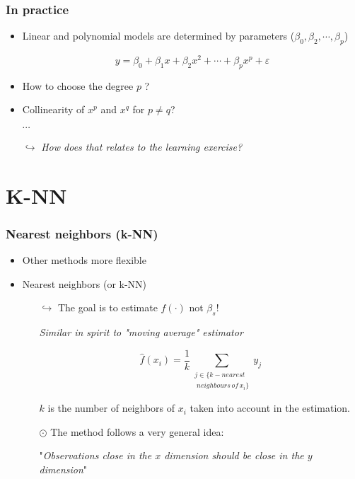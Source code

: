 \documentclass[xcolor=x11names,compress, aspectratio=169]{beamer}
\renewcommand{\(}{\begin{columns}}
\renewcommand{\)}{\end{columns}}
\newcommand{\<}[1]{\begin{column}{#1}}
\renewcommand{\>}{\end{column}}
\begin{document}
\begin{frame} %
\frametitle{In practice}

\begin{itemize}[<+->]
 \item Linear and polynomial models are determined by parameters ($\beta_0, \beta_2, \cdots, \beta_p$)
 \item[]  $$y = \beta_0 + \beta_1 x +  \beta_2 x^2 + \cdots + \beta_p x^p + \varepsilon$$
 \item How to choose the degree $p$ ?
 \item Collinearity of $x^p$ and $x^q$ for $ p \neq q$?
 \item[] $\cdots$
 \item[$\hookrightarrow$]  \textit{How does that relates to the learning exercise?}
 \end{itemize}
\end{frame}

\section{K-NN}

\begin{frame} %
\frametitle{ Nearest neighbors (k-NN)}

\begin{itemize}[<+->]
     \item Other methods more flexible
       \item Nearest neighbors  (or k-NN)
     \begin{itemize}[<+->]
        \item[$\hookrightarrow$] The goal is to estimate $f(\cdot)$ not $\beta_s$!
         \item[] \textit{Similar in spirit to "moving average" estimator}
         \item[] $$ \widehat{f} (x_i) = \frac{1}{k} \sum_{\substack{j \in \{ k-nearest \\ \; neighbours \, of \, x_i \} }}  y_j$$
         \item[] $k$ is the number of neighbors of $x_i$ taken into account in the estimation.
         \item[]
         \item[$\odot$] The method follows a very general idea:
         \item[]  "\emph{Observations close in the $x$ dimension should be close in the $y$ dimension}"
     \end{itemize}
\end{itemize}
\end{frame}
\end{document}
